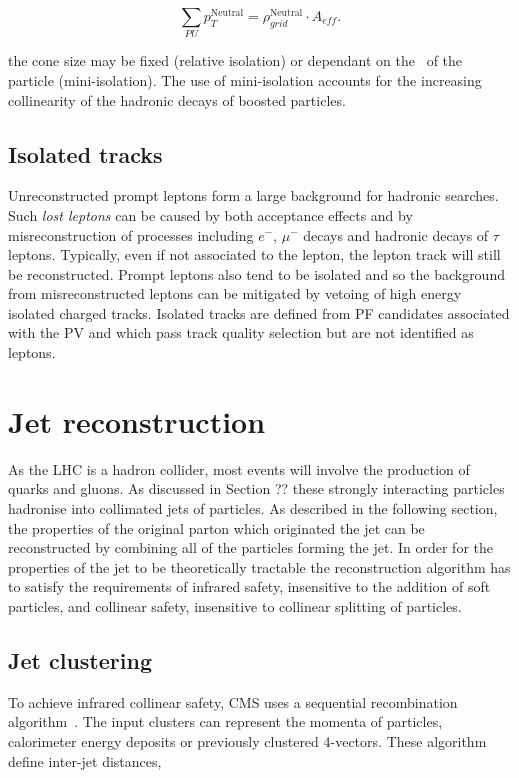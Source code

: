 \begin{equation}
\sum_{PU}p_T^{\text{Neutral}} = \rho_{grid}^{\text{Neutral}}\cdot A_{eff}.
\end{equation}

the cone size may be fixed (relative isolation) or dependant on the \pt~of the particle (mini-isolation). The use of mini-isolation
accounts for the increasing collinearity of the hadronic decays of boosted particles. 

\subsection{Isolated tracks}

Unreconstructed prompt leptons form a large background for hadronic searches.
Such \emph{lost leptons} can be caused by both acceptance effects and by misreconstruction of 
processes including $e^{-}$, $\mu^{-}$ decays and hadronic decays of $\tau$ leptons. 
Typically, even if not associated to the lepton, the lepton track will still be
reconstructed. Prompt leptons also tend to be isolated and so the background
from misreconstructed leptons can be mitigated by vetoing of high
energy isolated charged tracks. Isolated tracks are defined from PF candidates associated with the PV and 
which pass track quality selection but are not identified as leptons.

\section{Jet reconstruction} 

As the LHC is a hadron collider, most events will involve the production of quarks and gluons. As discussed in
Section ?? these strongly interacting particles hadronise into collimated jets of particles. As described 
in the following section, the properties of the original parton which originated the
jet can be reconstructed by combining all of the particles forming the jet. In order for the properties of the jet to be theoretically tractable the
reconstruction algorithm has to satisfy the requirements of infrared safety, insensitive to the addition of 
soft particles, and collinear safety, insensitive to collinear splitting of particles.

\subsection{Jet clustering}

To achieve infrared collinear safety, CMS uses a sequential recombination algorithm~\cite{antikt}. The input clusters can represent
the momenta of particles, calorimeter energy deposits or previously clustered
4-vectors. These algorithm define inter-jet distances,

